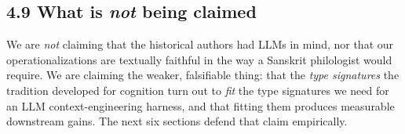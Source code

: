 \subsection{\texorpdfstring{4.9 What is \emph{not} being claimed}{4.9 What is not being claimed}}\label{what-is-not-being-claimed}

We are \emph{not} claiming that the historical authors had LLMs in mind, nor that our operationalizations are textually faithful in the way a Sanskrit philologist would require. We are claiming the weaker, falsifiable thing: that the \emph{type signatures} the tradition developed for cognition turn out to \emph{fit} the type signatures we need for an LLM context-engineering harness, and that fitting them produces measurable downstream gains. The next six sections defend that claim empirically.
